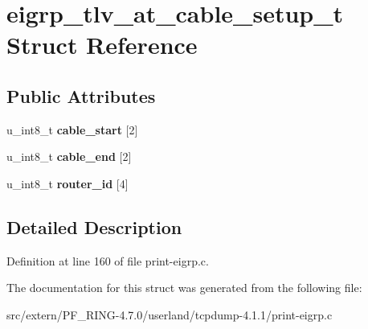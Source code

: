 \hypertarget{structeigrp__tlv__at__cable__setup__t}{
\section{eigrp\_\-tlv\_\-at\_\-cable\_\-setup\_\-t Struct Reference}
\label{structeigrp__tlv__at__cable__setup__t}
}
\subsection*{Public Attributes}
\begin{DoxyCompactItemize}
\item 
\hypertarget{structeigrp__tlv__at__cable__setup__t_a3ac1f0f0e3e47221b2e5394445cf541b}{
u\_\-int8\_\-t {\bfseries cable\_\-start} \mbox{[}2\mbox{]}}
\label{structeigrp__tlv__at__cable__setup__t_a3ac1f0f0e3e47221b2e5394445cf541b}

\item 
\hypertarget{structeigrp__tlv__at__cable__setup__t_a581fd83f3547cf1c8c05b4cb493e1c31}{
u\_\-int8\_\-t {\bfseries cable\_\-end} \mbox{[}2\mbox{]}}
\label{structeigrp__tlv__at__cable__setup__t_a581fd83f3547cf1c8c05b4cb493e1c31}

\item 
\hypertarget{structeigrp__tlv__at__cable__setup__t_addacad0255108f1bde8f31f84331ea8c}{
u\_\-int8\_\-t {\bfseries router\_\-id} \mbox{[}4\mbox{]}}
\label{structeigrp__tlv__at__cable__setup__t_addacad0255108f1bde8f31f84331ea8c}

\end{DoxyCompactItemize}


\subsection{Detailed Description}


Definition at line 160 of file print-\/eigrp.c.



The documentation for this struct was generated from the following file:\begin{DoxyCompactItemize}
\item 
src/extern/PF\_\-RING-\/4.7.0/userland/tcpdump-\/4.1.1/print-\/eigrp.c\end{DoxyCompactItemize}
